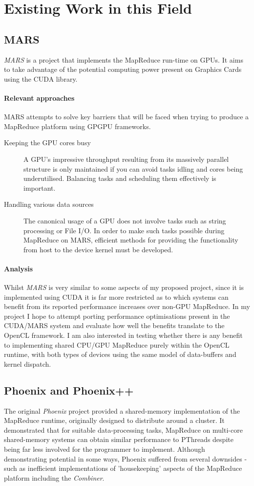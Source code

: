 \section{Existing Work in this Field}
\subsection{MARS}
\emph{MARS}\cite{mars} is a project that implements the MapReduce run-time on \ac{GPUs}. It aims to take advantage of the potential computing power present on Graphics Cards using the \ac{CUDA} library.
\paragraph{Relevant approaches}
MARS attempts to solve key barriers that will be faced when trying to produce a MapReduce platform using \ac{GPGPU} frameworks.
\begin{description}
  \item[Keeping the GPU cores busy]

    A GPU's impressive throughput resulting from its massively parallel structure is only maintained if you can avoid tasks idling and cores being underutilised. Balancing tasks and scheduling them effectively is important.

  \item[Handling various data sources]
    The canonical usage of a GPU does not involve tasks such as string processing or File I/O.
    In order to make such tasks possible during MapReduce on MARS, efficient methods for providing the functionality from host to the device kernel must be developed.
\end{description}
\paragraph{Analysis}
Whilst \emph{MARS} is very similar to some aspects of my proposed project, since it is implemented using \ac{CUDA} it is far more restricted as to which systems can benefit from its reported performance increases over non-GPU MapReduce. In my project I hope to attempt porting performance optimisations present in the \ac{CUDA}/MARS system and evaluate how well the benefits translate to the OpenCL framework. I am also interested in testing whether there is any benefit to implementing shared CPU/GPU MapReduce purely within the OpenCL runtime, with both types of devices using the same model of data-buffers and kernel dispatch.
\subsection{Phoenix and Phoenix++}
The original \emph{Phoenix}\cite{phoenix} project provided a shared-memory implementation of the MapReduce runtime, originally designed to distribute around a cluster. It demonstrated that for suitable data-processing tasks, MapReduce on multi-core shared-memory systems can obtain similar performance to PThreads despite being far less involved for the programmer to implement. Although demonstrating potential in some ways, Phoenix suffered from several downsides - such as inefficient implementations of 'housekeeping' aspects of the MapReduce platform including the \emph{Combiner}.

